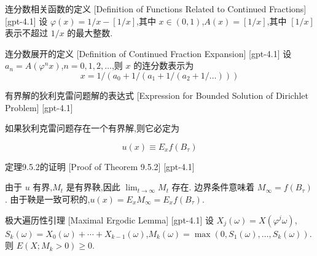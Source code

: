 \documentclass[UTF8]{ctexart}
\begin{document}
    
    
    \begin{dfn}
        {连分数相关函数的定义}
        [Definition of Functions Related to Continued Fractions]
        [gpt-4.1]
        设 $\varphi(x) = 1/x - [1/x]$,其中 $x \in (0,1)$,$A(x) = [1/x]$,其中 $[1/x]$ 表示不超过 $1/x$ 的最大整数.
    \end{dfn}
    
    
    
    \begin{dfn}
        {连分数展开的定义}
        [Definition of Continued Fraction Expansion]
        [gpt-4.1]
        设 $a_n = A(\varphi^n x)$,$n = 0, 1, 2, \ldots$,则 $x$ 的连分数表示为
\[
x = 1 / (a_0 + 1 / (a_1 + 1 / (a_2 + 1 / \ldots)))
\]

    \end{dfn}
    
    
    
    \begin{thm}
        {有界解的狄利克雷问题解的表达式}
        [Expression for Bounded Solution of Dirichlet Problem]
        [gpt-4.1]
        
如果狄利克雷问题存在一个有界解,则它必定为

\[
u(x) \equiv E_{x} f(B_{\tau})
\]

    \end{thm}
    
    
    
    \begin{prf}
        {定理9.5.2的证明}
        [Proof of Theorem 9.5.2]
        [gpt-4.1]
        
由于 $u$ 有界,$M_{t}$ 是有界鞅,因此 $\lim_{t \to \infty} M_{t}$ 存在.
边界条件意味着 $M_{\infty} = f(B_{\tau})$.
由于鞅是一致可积的,$u(x) = E_{x} M_{\infty} = E_{x} f(B_{\tau})$.

    \end{prf}
    
    
    
    \begin{lma}
        {极大遍历性引理}
        [Maximal Ergodic Lemma]
        [gpt-4.1]
        设 $X_j(\omega) = X(\varphi^j \omega)$,$S_k(\omega) = X_0(\omega) + \cdots + X_{k-1}(\omega)$,$M_k(\omega) = \max (0, S_1(\omega), \ldots, S_k(\omega))$.
则 $E(X ; M_k > 0) \geq 0$.
    \end{lma}
    
\end{document}
